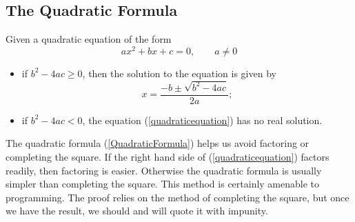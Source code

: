 \subsection{The Quadratic Formula}
\begin{theorem}\label{QuadraticFormulaTheorem}
Given a quadratic equation of the form
\begin{equation}
ax^2+bx+c=0,\qquad a\ne0\label{quadraticequation}
\end{equation}
\begin{itemize}
\item if $b^2-4ac\ge0$, then the solution to the equation is given by
\begin{equation}
x=\frac{-b\pm\sqrt{b^2-4ac}}{2a};\label{QuadraticFormula}\end{equation}
\item if $b^2-4ac<0$, the equation \rm{(\ref{quadraticequation})} 
has no real solution.\end{itemize}
\end{theorem} 
The quadratic formula (\ref{QuadraticFormula}) helps us avoid factoring 
or completing the square.  If the right hand side of (\ref{quadraticequation})
factors readily, then factoring is easier.  Otherwise the quadratic
formula is usually simpler than completing the square.  This method is
certainly amenable to programming.  The proof relies on the method of 
completing the square, but once we have the result, we should and will
quote it with impunity.
\bigskip

